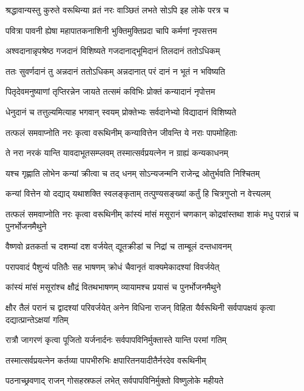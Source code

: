 \twolineshloka
{श्रद्धावान्यस्तु कुरुते वरूथिन्या व्रतं नरः}
{वाञ्छितं लभते सोऽपि इह लोके परत्र च} %

\twolineshloka
{पवित्रा पावनी ह्येषा महापातकनाशिनी}
{भुक्तिमुक्तिप्रदा चापि कर्मणां नृपसत्तम} %

\twolineshloka
{अश्वदानान्नृपश्रेष्ठ गजदानं विशिष्यते}
{गजदानाद्भूमिदानं तिलदानं ततोऽधिकम्} %

\twolineshloka
{ततः सुवर्णदानं तु अन्नदानं ततोऽधिकम्}
{अन्नदानात् परं दानं न भूतं न भविष्यति} %

\twolineshloka
{पितृदेवमनुष्याणां तृप्तिरन्नेन जायते}
{तत्समं कविभिः प्रोक्तं कन्यादानं नृपोत्तम} %

\twolineshloka
{धेनुदानं च तत्तुल्यमित्याह भगवान् स्वयम्}
{प्रोक्तेभ्यः सर्वदानेभ्यो विद्यादानं विशिष्यते} %

\twolineshloka
{तत्फलं समवाप्नोति नरः कृत्वा वरूथिनीम्}
{कन्यावित्तेन जीवन्ति ये नराः पापमोहिताः} %

\twolineshloka
{ते नरा नरकं यान्ति यावदाभूतसम्प्लवम्}
{तस्मात्सर्वप्रयत्नेन न ग्राह्यं कन्यकाधनम्} %

\twolineshloka
{यश्च गृह्णाति लोभेन कन्यां क्रीत्वा च तद् धनम्}
{सोऽन्यजन्मनि राजेन्द्र ओतुर्भवति निश्चितम्} %

\twolineshloka
{कन्यां वित्तेन यो दद्याद् यथाशक्ति स्वलङ्कृताम्}
{तत्पुण्यसङ्ख्यां कर्तुं हि चित्रगुप्तो न वेत्त्यलम्} %


\threelineshloka
{तत्फलं समवाप्नोति नरः कृत्वा वरूथिनीम्}
{कांस्यं मांसं मसूरानं चणकान् कोद्रवांस्तथा}
{शाकं मधु परान्नं च पुनर्भोजनमैथुने} %

\twolineshloka
{वैष्णवो व्रतकर्ता च दशम्यां दश वर्जयेत्}
{द्यूतक्रीडां च निद्रां च ताम्बूलं दन्तधावनम्} %

\twolineshloka
{परापवादं पैशुन्यं पतितैः सह भाषणम्}
{क्रोधं चैवानृतं वाक्यमेकादश्यां विवर्जयेत्} %

\twolineshloka
{कांस्यं मांसं मसूरांश्च क्षौद्रं वितथभाषणम्}
{व्यायामश्च प्रयासं च पुनर्भोजनमैथुने} %


\threelineshloka
{क्षौर तैलं परानं च द्वादश्यां परिवर्जयेत्}
{अनेन विधिना राजन् विहिता यैर्वरूथिनी}
{सर्वपापक्षयं कृत्वा दद्यात्प्रान्तेऽक्षयां गतिम्} %

\twolineshloka
{रात्रौ जागरणं कृत्वा पूजितो यर्जनार्दनः}
{सर्वपापविनिर्मुक्तास्ते यान्ति परमां गतिम्} %

\twolineshloka
{तस्मात्सर्वप्रयत्नेन कर्तव्या पापभीरुभिः}
{क्षपारितनयादीतैर्नरदेव वरूथिनीम्} %

\twolineshloka
{पठनाच्छ्रवणाद् राजन् गोसहस्रफलं लभेत्}
{सर्वपापविनिर्मुक्तो विष्णुलोके महीयते} %

